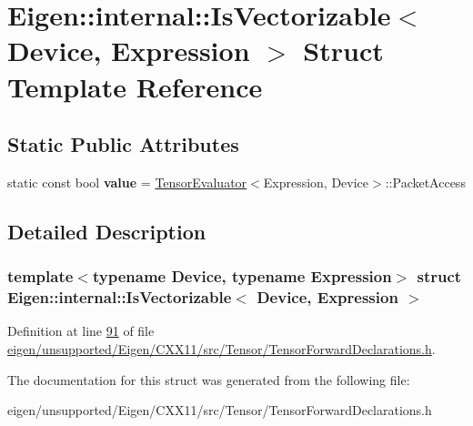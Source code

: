 \hypertarget{struct_eigen_1_1internal_1_1_is_vectorizable}{}\section{Eigen\+:\+:internal\+:\+:Is\+Vectorizable$<$ Device, Expression $>$ Struct Template Reference}
\label{struct_eigen_1_1internal_1_1_is_vectorizable}
\subsection*{Static Public Attributes}
\begin{DoxyCompactItemize}
\item 
\mbox{\label{struct_eigen_1_1internal_1_1_is_vectorizable_a18ca7664213e1794faea2d537435aa7e}} 
static const bool {\bfseries value} = \hyperlink{struct_eigen_1_1_tensor_evaluator}{Tensor\+Evaluator}$<$Expression, Device$>$\+::Packet\+Access
\end{DoxyCompactItemize}


\subsection{Detailed Description}
\subsubsection*{template$<$typename Device, typename Expression$>$\newline
struct Eigen\+::internal\+::\+Is\+Vectorizable$<$ Device, Expression $>$}



Definition at line \hyperlink{eigen_2unsupported_2_eigen_2_c_x_x11_2src_2_tensor_2_tensor_forward_declarations_8h_source_l00091}{91} of file \hyperlink{eigen_2unsupported_2_eigen_2_c_x_x11_2src_2_tensor_2_tensor_forward_declarations_8h_source}{eigen/unsupported/\+Eigen/\+C\+X\+X11/src/\+Tensor/\+Tensor\+Forward\+Declarations.\+h}.



The documentation for this struct was generated from the following file\+:\begin{DoxyCompactItemize}
\item 
eigen/unsupported/\+Eigen/\+C\+X\+X11/src/\+Tensor/\+Tensor\+Forward\+Declarations.\+h\end{DoxyCompactItemize}
